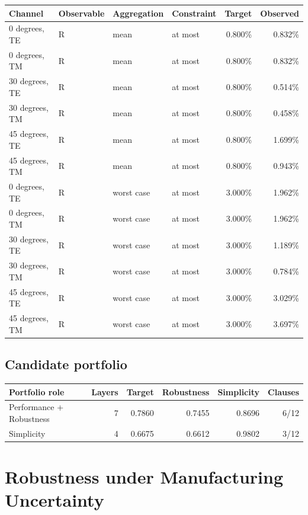 \begin{longtable}[]{@{}llllrr@{}}
\toprule
Channel & Observable & Aggregation & Constraint & Target & Observed \\
\midrule
\endhead
0 degrees, TE & R & mean & at most & 0.800\% & 0.832\% \\
0 degrees, TM & R & mean & at most & 0.800\% & 0.832\% \\
30 degrees, TE & R & mean & at most & 0.800\% & 0.514\% \\
30 degrees, TM & R & mean & at most & 0.800\% & 0.458\% \\
45 degrees, TE & R & mean & at most & 0.800\% & 1.699\% \\
45 degrees, TM & R & mean & at most & 0.800\% & 0.943\% \\
0 degrees, TE & R & worst case & at most & 3.000\% & 1.962\% \\
0 degrees, TM & R & worst case & at most & 3.000\% & 1.962\% \\
30 degrees, TE & R & worst case & at most & 3.000\% & 1.189\% \\
30 degrees, TM & R & worst case & at most & 3.000\% & 0.784\% \\
45 degrees, TE & R & worst case & at most & 3.000\% & 3.029\% \\
45 degrees, TM & R & worst case & at most & 3.000\% & 3.697\% \\
\bottomrule
\end{longtable}

\hypertarget{candidate-portfolio}{%
\subsection{Candidate portfolio}\label{candidate-portfolio}}

\begin{longtable}[]{@{}lrrrrr@{}}
\toprule
Portfolio role & Layers & Target & Robustness & Simplicity & Clauses \\
\midrule
\endhead
Performance + Robustness & 7 & 0.7860 & 0.7455 & 0.8696 & 6/12 \\
Simplicity & 4 & 0.6675 & 0.6612 & 0.9802 & 3/12 \\
\bottomrule
\end{longtable}

\hypertarget{robustness-under-manufacturing-uncertainty}{%
\section{Robustness under Manufacturing Uncertainty}\label{robustness-under-manufacturing-uncertainty}}

